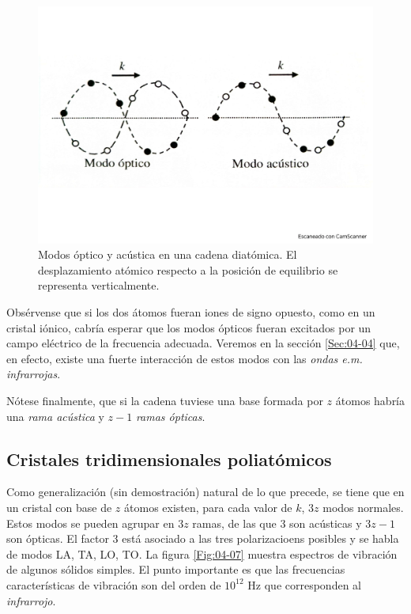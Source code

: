 \begin{figure}[h!] \centering
    \includegraphics[scale=0.42]{Cuerpo/Ch_04/Fotos libro 6.pdf}
    \caption{Modos óptico y acústica en una cadena diatómica. El desplazamiento atómico respecto a la posición de equilibrio se representa verticalmente.}
    \label{Fig:04-06}
\end{figure}    

Obsérvense que si los dos átomos fueran iones de signo opuesto, como en un cristal iónico, cabría esperar que los modos ópticos fueran excitados por un campo eléctrico de la frecuencia adecuada. Veremos en la sección \ref{Sec:04-04} que, en efecto, existe una fuerte interacción de estos modos con las \textit{ondas e.m. infrarrojas}. 

Nótese finalmente, que si la cadena tuviese una base formada por $z$ átomos habría una \textit{rama acústica} y $z-1$ \textit{ramas ópticas}.

\subsection{Cristales tridimensionales poliatómicos}

Como generalización (sin demostración) natural de lo que precede, se tiene que en un cristal con base de $z$ átomos existen, para cada valor de $k$, $3z$ modos normales. Estos modos se pueden agrupar en $3z$ ramas, de las que $3$ son acústicas y $3z-1$ son ópticas. El factor 3 está asociado a las tres polarizacioens posibles y se habla de modos LA, TA, LO, TO. La figura \ref{Fig:04-07} muestra espectros de vibración de algunos sólidos simples. El punto importante es que las frecuencias características de vibración son del orden de $10^{12}$ Hz que corresponden al \textit{infrarrojo}.

